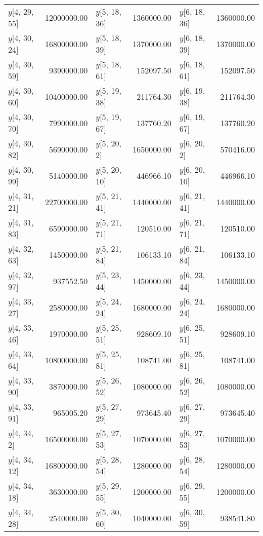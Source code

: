 \begin{longtable}{lrlrlr}
$y$[4, 29, 55] & 12000000.00 & $y$[5, 18, 36] & 1360000.00 & $y$[6, 18, 36] & 1360000.00 \\
$y$[4, 30, 24] & 16800000.00 & $y$[5, 18, 39] & 1370000.00 & $y$[6, 18, 39] & 1370000.00 \\
$y$[4, 30, 59] & 9390000.00 & $y$[5, 18, 61] & 152097.50 & $y$[6, 18, 61] & 152097.50 \\
$y$[4, 30, 60] & 10400000.00 & $y$[5, 19, 38] & 211764.30 & $y$[6, 19, 38] & 211764.30 \\
$y$[4, 30, 70] & 7990000.00 & $y$[5, 19, 67] & 137760.20 & $y$[6, 19, 67] & 137760.20 \\
$y$[4, 30, 82] & 5690000.00 & $y$[5, 20, 2] & 1650000.00 & $y$[6, 20, 2] & 570416.00 \\
$y$[4, 30, 99] & 5140000.00 & $y$[5, 20, 10] & 446966.10 & $y$[6, 20, 10] & 446966.10 \\
$y$[4, 31, 21] & 22700000.00 & $y$[5, 21, 41] & 1440000.00 & $y$[6, 21, 41] & 1440000.00 \\
$y$[4, 31, 83] & 6590000.00 & $y$[5, 21, 71] & 120510.00 & $y$[6, 21, 71] & 120510.00 \\
$y$[4, 32, 63] & 1450000.00 & $y$[5, 21, 84] & 106133.10 & $y$[6, 21, 84] & 106133.10 \\
$y$[4, 32, 97] & 937552.50 & $y$[5, 23, 44] & 1450000.00 & $y$[6, 23, 44] & 1450000.00 \\
$y$[4, 33, 27] & 2580000.00 & $y$[5, 24, 24] & 1680000.00 & $y$[6, 24, 24] & 1680000.00 \\
$y$[4, 33, 46] & 1970000.00 & $y$[5, 25, 51] & 928609.10 & $y$[6, 25, 51] & 928609.10 \\
$y$[4, 33, 64] & 10800000.00 & $y$[5, 25, 81] & 108741.00 & $y$[6, 25, 81] & 108741.00 \\
$y$[4, 33, 90] & 3870000.00 & $y$[5, 26, 52] & 1080000.00 & $y$[6, 26, 52] & 1080000.00 \\
$y$[4, 33, 91] & 965005.20 & $y$[5, 27, 29] & 973645.40 & $y$[6, 27, 29] & 973645.40 \\
$y$[4, 34, 2] & 16500000.00 & $y$[5, 27, 53] & 1070000.00 & $y$[6, 27, 53] & 1070000.00 \\
$y$[4, 34, 12] & 16800000.00 & $y$[5, 28, 54] & 1280000.00 & $y$[6, 28, 54] & 1280000.00 \\
$y$[4, 34, 18] & 3630000.00 & $y$[5, 29, 55] & 1200000.00 & $y$[6, 29, 55] & 1200000.00 \\
$y$[4, 34, 28] & 2540000.00 & $y$[5, 30, 60] & 1040000.00 & $y$[6, 30, 59] & 938541.80 \\

\end{longtable}
